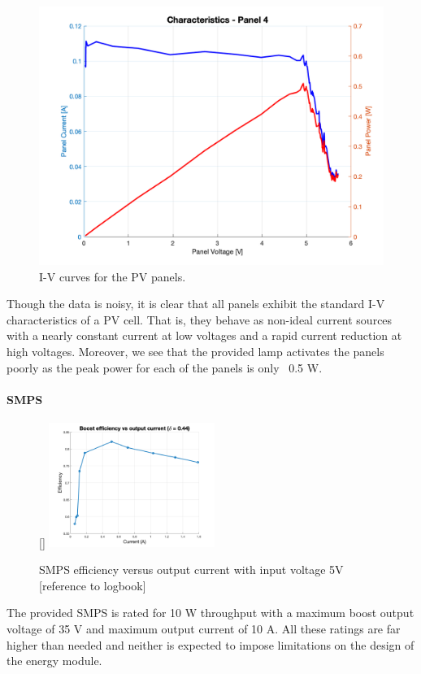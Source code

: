 \documentclass[a4paper]{article}
\begin{document}
\begin{figure}[H]
    \includegraphics[scale=0.18]{Panel4.png}
    \caption{I-V curves for the PV panels.}
    \label{fig:IV_curve}
    \end{figure}

Though the data is noisy, it is clear that all panels exhibit the standard 
I-V characteristics of a PV cell. That is, they behave as non-ideal current 
sources with a nearly constant current at low voltages and a rapid current 
reduction at high voltages\cite{green}. Moreover, we see that the provided lamp activates 
the panels poorly as the peak power for each of the panels is only ~0.5 W.

\paragraph*{SMPS}
\begin{figure}
    \centering
    \raisebox{0pt}[\dimexpr{}\baselineskip\relax]{%
        \includegraphics[width=0.48\textwidth]{Boost_efficiency_wduty.png}
    }%
    \vspace{0pt}
    \caption{SMPS efficiency versus output current with input voltage 5V [reference to logbook]}
    \label{fig:efficiency}
\end{figure}
The provided SMPS is rated for 10 W throughput with a maximum boost output voltage of 35 V 
and maximum output current of 10 A\cite{SMPS_lab}. All these ratings are far higher 
than needed and neither is expected to impose limitations on the design of the energy module. 
\end{document}
